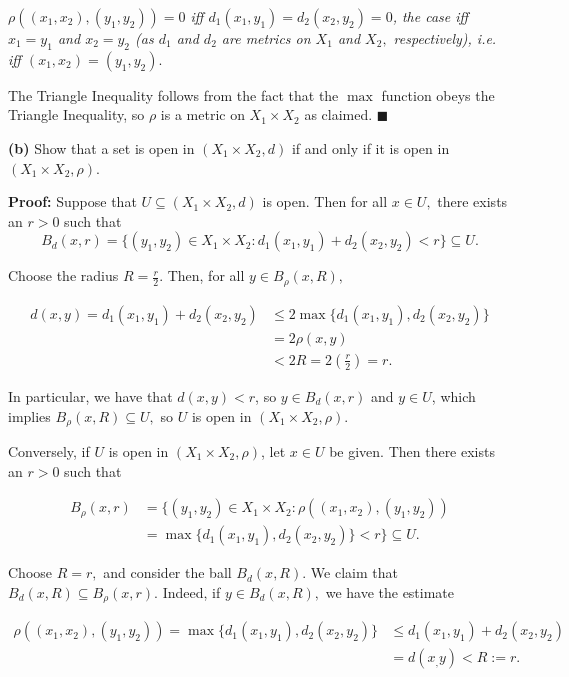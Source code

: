 \documentclass{article}
\begin{document}
\textit{$\rho((x_1,x_2),(y_1,y_2))=0$ iff $d_1(x_1,y_1)=d_2(x_2,y_2)=0$, the case iff $x_1=y_1$ and $x_2=y_2$ (as $d_1$ and $d_2$ are metrics on $X_1$ and $X_2,$ respectively), i.e. iff $(x_1,x_2)=(y_1,y_2).$}

The Triangle Inequality follows from the fact that the $\max$ function obeys the Triangle Inequality, so $\rho$ is a metric on $X_1\times X_2$ as claimed. $\blacksquare$

\begin{tcolorbox}
    \textbf{(b)} Show that a set is open in $\left(X_1\times X_2,d\right)$ if and only if it is open in $\left(X_1\times X_2,\rho\right).$
\end{tcolorbox}

\textbf{Proof:} Suppose that $U\subseteq\left(X_1\times X_2,d\right)$ is open. Then for all $x\in U,$ there exists an $r>0$ such that
\begin{equation*}
B_d(x,r)=\{(y_1,y_2)\in X_1\times X_2: d_1(x_1,y_1)+d_2(x_2,y_2)<r\}\subseteq U.
\end{equation*}

Choose the radius $R=\frac{r}{2}$. Then, for all $y\in B_\rho (x,R),$

\begin{align*}
    d(x,y)=d_1(x_1,y_1)+d_2(x_2,y_2)&\leq 2\max \{d_1(x_1,y_1),d_2(x_2,y_2)\}\\
    &=2\rho (x,y)\\
    &< 2R=2\left(\frac{r}{2}\right)=r.
\end{align*}

In particular, we have that $d(x,y)<r$, so $y\in B_d(x,r)$ and $y\in U$, which implies $B_\rho (x,R)\subseteq U,$ so $U$ is open in $\left(X_1\times X_2,\rho \right)$.

Conversely, if $U$ is open in $\left(X_1\times X_2,\rho \right)$, let $x\in U$ be given. Then there exists an $r>0$ such that 

\begin{align*}
    B_\rho (x,r)&=\{(y_1,y_2)\in X_1\times X_2:\rho((x_1,x_2),(y_1,y_2))\\&=\max \{d_1(x_1,y_1),d_2(x_2,y_2)\}<r\}\subseteq U.
\end{align*}

Choose $R=r,$ and consider the ball $B_d(x,R).$ We claim that $B_d(x,R)\subseteq B_\rho (x,r).$ Indeed, if $y\in B_d(x,R),$ we have the estimate

\begin{align*}
    \rho((x_1,x_2),(y_1,y_2))=\max \{d_1(x_1,y_1),d_2(x_2,y_2)\}&\leq d_1(x_1,y_1)+d_2(x_2,y_2)\\
    &=d(x_,y)<R:=r.
\end{align*}
\end{document}
